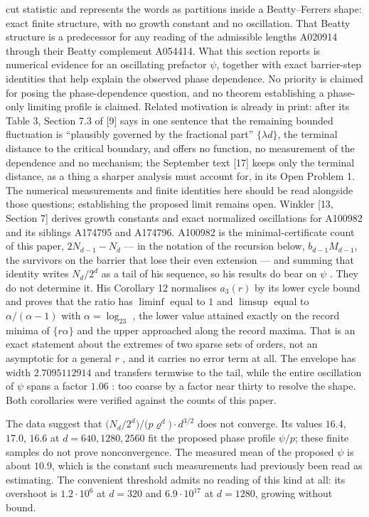 \documentclass[11pt,a4paper]{article}
\begin{document}
cut statistic and represents the words as partitions inside a
Beatty--Ferrers shape: exact finite structure, with no growth constant
and no oscillation. That Beatty structure is a predecessor for any
reading of the admissible lengths A020914 through their Beatty
complement A054414. What this section reports is numerical evidence for
an oscillating prefactor \(\psi\), together with exact barrier-step
identities that help explain the observed phase dependence. No priority
is claimed for posing the phase-dependence question, and no theorem
establishing a phase-only limiting profile is claimed. Related
motivation is already in print: after its Table 3, Section 7.3 of
{[}9{]} says in one sentence that the remaining bounded fluctuation is
``plausibly governed by the fractional part'' \(\{\lambda d\}\), the
terminal distance to the critical boundary, and offers no function, no
measurement of the dependence and no mechanism; the September text
{[}17{]} keeps only the terminal distance, as a thing a sharper analysis
must account for, in its Open Problem 1. The numerical measurements and
finite identities here should be read alongside those questions;
establishing the proposed limit remains open. Winkler {[}13, Section
7{]} derives growth constants and exact normalized oscillations for
A100982 and its siblings A174795 and A174796. A100982 is the
minimal-certificate count of this paper, \(2N_{d-1}-N_d\) --- in the
notation of the recursion below, \(b_{d-1}M_{d-1}\), the survivors on
the barrier that lose their even extension --- and summing that identity
writes \(N_d/2^d\) as a tail of his sequence, so his results do bear on
\(\psi\) . They do not determine it. His Corollary 12 normalises
\(a_3(r)\) by its lower cycle bound and proves that the ratio has
\(\liminf\) equal to \(1\) and \(\limsup\) equal to
\(\alpha/(\alpha-1)\) with \(\alpha=\log_23\) , the lower value attained
exactly on the record minima of \(\{r\alpha\}\) and the upper approached
along the record maxima. That is an exact statement about the extremes
of two sparse sets of orders, not an asymptotic for a general \(r\) ,
and it carries no error term at all. The envelope has width
\(2.7095112914\) and transfers termwise to the tail, while the entire
oscillation of \(\psi\) spans a factor \(1.06\) : too coarse by a factor
near thirty to resolve the shape. Both corollaries were verified against
the counts of this paper.

The data suggest that
\(\bigl(N_d/2^d\bigr)\big/\bigl(p\varrho^{d}\bigr)\cdot
d^{3/2}\) does not converge. Its values \(16.4\), \(17.0\), \(16.6\) at
\(d=640,1280,2560\) fit the proposed phase profile \(\psi/p\); these
finite samples do not prove nonconvergence. The measured mean of the
proposed \(\psi\) is about \(10.9\), which is the constant such
measurements had previously been read as estimating. The convenient
threshold admits no reading of this kind at all: its overshoot is
\(1.2\cdot10^{6}\) at \(d=320\) and \(6.9\cdot10^{17}\) at \(d=1280\),
growing without bound.
\end{document}
